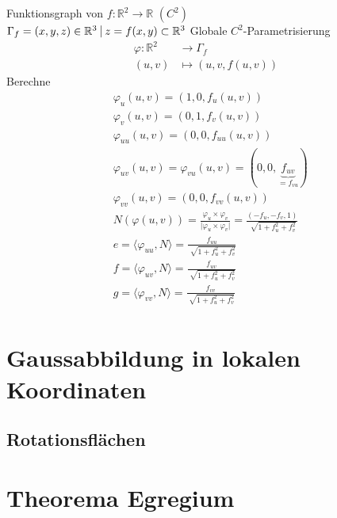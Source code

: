 \documentclass[../main.tex]{subfiles}
\begin{document}
\begin{example}
    Funktionsgraph von $f: \mathbb{R}^{2} \rightarrow \mathbb{R}$ $(C^{2})$\\
    $\Gamma_{f} = {(x,y,z)\in\mathbb{R}^{3} \ \vline \ z = f(x,y)} \subset \mathbb{R}^{3}$ Globale $C^{2}$-Parametrisierung \begin{align*}
        \varphi:\mathbb{R}^{2} &\rightarrow \Gamma_{f}\\
        (u,v) &\mapsto (u,v,f(u,v))
    \end{align*}
    Berechne 
    \begin{align*}
        &\varphi_{u}(u,v) = (1, 0, f_{u}(u,v))\\
        &\varphi_{v}(u,v) = (0, 1, f_{v}(u,v))\\
        &\varphi_{uu}(u,v) = (0, 0, f_{uu}(u,v))\\
        &\varphi_{uv}(u,v) = \varphi_{vu}(u,v) = (0, 0, \underbrace{f_{uv}}_{=f_{vu}})\\
        &\varphi_{vv}(u,v) = (0, 0, f_{vv}(u,v))\\
        &N(\varphi(u,v)) = \frac{\varphi_{u}\times\varphi_{v}}{\lvert\varphi_{u}\times\varphi_{v}\rvert} = \frac{(-f_{u}, -f_{v}, 1)}{\sqrt[]{1 + f_{u}^{2}+f_{v}^{2}}}\\
        &e = \langle \varphi_{uu}, N \rangle = \frac{f_{uu}}{\sqrt[]{1 + f_{u}^{2}+f_{v}^{2}}}\\
        &f = \langle \varphi_{uv}, N \rangle = \frac{f_{uv}}{\sqrt[]{1 + f_{u}^{2}+f_{v}^{2}}}\\
        &g = \langle \varphi_{vv}, N \rangle = \frac{f_{vv}}{\sqrt[]{1 + f_{u}^{2}+f_{v}^{2}}}\\
    \end{align*}
\end{example}

\section{Gaussabbildung in lokalen Koordinaten}



\subsection*{Rotationsflächen}

\section{Theorema Egregium}
\end{document}
